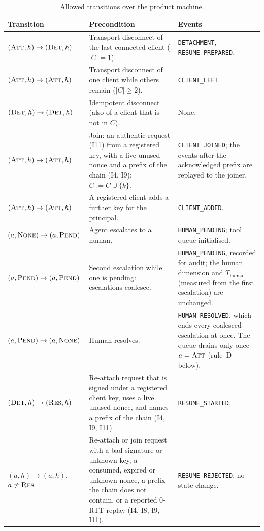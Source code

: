 \begin{table}[htbp]
\centering
\caption{Allowed transitions over the product machine.}
\label{tab:transitions}
\footnotesize
\begin{tabularx}{\columnwidth}{l X X}
\toprule
\textbf{Transition} & \textbf{Precondition} & \textbf{Events} \\
\midrule
$(\textsc{Att},h) \to (\textsc{Det},h)$ & Transport disconnect of the
last connected client ($|C|=1$). & \texttt{DETACHMENT},
\texttt{RESUME\_PREPARED}. \\
$(\textsc{Att},h) \to (\textsc{Att},h)$ & Transport disconnect of one
client while others remain ($|C|\geq 2$). & \texttt{CLIENT\_LEFT}. \\
$(\textsc{Det},h) \to (\textsc{Det},h)$ & Idempotent disconnect (also of a
client that is not in $C$). & None. \\
$(\textsc{Att},h) \to (\textsc{Att},h)$ & Join: an authentic request
(I11) from a registered key, with a live unused nonce and a prefix of the
chain (I4, I9); $C := C \cup \{k\}$. & \texttt{CLIENT\_JOINED}; the
events after the acknowledged prefix are replayed to the joiner. \\
$(\textsc{Att},h) \to (\textsc{Att},h)$ & A registered client adds a
further key for the principal. & \texttt{CLIENT\_ADDED}. \\
$(a,\textsc{None}) \to (a,\textsc{Pend})$ & Agent escalates to a
human. & \texttt{HUMAN\_PENDING}; tool queue initialised. \\
$(a,\textsc{Pend}) \to (a,\textsc{Pend})$ & Second escalation while
one is pending: escalations coalesce. & \texttt{HUMAN\_PENDING}, recorded
for audit; the human dimension and $T_{\text{human}}$ (measured from the
first escalation) are unchanged. \\
$(a,\textsc{Pend}) \to (a,\textsc{None})$ & Human resolves. &
\texttt{HUMAN\_RESOLVED}, which ends every coalesced escalation at once.
The queue drains only once $a=\textsc{Att}$ (rule~D below). \\
$(\textsc{Det},h) \to (\textsc{Res},h)$ & Re-attach request that is
signed under a registered client key, uses a live unused nonce, and
names a prefix of the chain (I4, I9, I11). & \texttt{RESUME\_STARTED}. \\
$(a,h) \to (a,h)$, $a \neq \textsc{Res}$ & Re-attach or join request
with a bad signature or unknown key, a consumed, expired or unknown
nonce, a prefix the chain does not contain, or a reported 0-RTT replay
(I4, I8, I9, I11). & \texttt{RESUME\_REJECTED}; no state change. \\

\end{tabularx}
\end{table}
